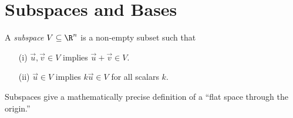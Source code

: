 \documentclass{problemset}
\begin{document}
\section*{Subspaces and Bases}
	\vspace{-1em}
	\begin{definition}[Subspace]
		A \emph{subspace} $V\subseteq \R^n$ is a non-empty subset such that
		\begin{enumerate}
			\item[(i)] $\vec u,\vec v\in V$ implies $\vec u+\vec v\in V$.
			\item[(ii)] $\vec u\in V$ implies $k\vec u\in V$ for all scalars $k$.
		\end{enumerate}
	\end{definition}

	Subspaces give a mathematically precise definition of a ``flat space through the origin.''
\end{document}
